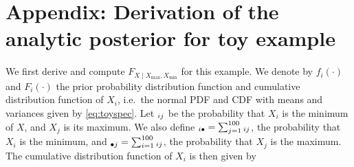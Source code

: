 \documentclass[letter]{article}
\let\Pr\relax
\DeclareMathOperator{\Pr}{\mathbb{P}}
\newcommand{\Xmax}{X_{\max}}
\newcommand{\Xmin}{X_{\min}}
\newcommand{\Fcond}{F_{X \mid \Xmax,\Xmin}}
\newcommand{\pxx}[2]{\Pr{}_{#1#2}}
\newcommand{\pij}{\pxx{i}{j}}
\newcommand{\pisum}{\pxx{i}{\bullet}}
\newcommand{\psumj}{\pxx{\bullet}{j}}
\begin{document}
%
%    
%
%
%
%
    
\section*{Appendix: Derivation of the analytic posterior for toy example}\label{derivation-of-the-analytic-posterior-for-toy-example}
    

\label{sec:analytical_posterior}
        We first derive and compute \(\Fcond\) for this example.
We denote by \(f_i(\cdot)\) and \(F_i(\cdot)\) the prior probability distribution function and cumulative distribution function of \(X_i\), i.e.~the normal PDF and CDF with means and variances given by \eqref{eq:toyspec}.
Let \(\pij\) be the probability that \(X_i\) is the minimum of \(X\), and \(X_j\) is its maximum.
We also define \(\pisum = \sum_{j=1}^{100} \pij\), the probability that \(X_i\) is the minimum,
and \(\psumj = \sum_{i=1}^{100} \pij\), the probability that \(X_j\) is the maximum.
The cumulative distribution function of \(X_i\) is then given by
\end{document}
